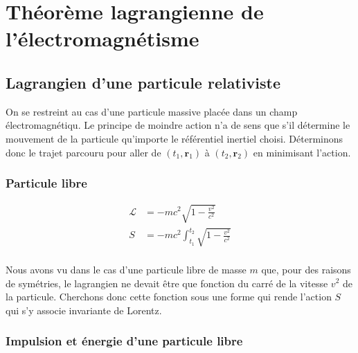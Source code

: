 \section{Théorème lagrangienne de l’électromagnétisme}

    \subsection{Lagrangien d’une particule relativiste}

    On se restreint au cas d’une particule massive placée dans un champ électromagnétiqu. Le principe de moindre action n’a de sens que s’il détermine le mouvement de la particule qu’importe le référentiel inertiel choisi. Déterminons donc le trajet parcouru pour aller de $(t_1, \mathbf{r}_1)$ à $(t_2, \mathbf{r}_2)$ en minimisant l’action.

        \subsubsection{Particule libre}

        \begin{omed}{}
            \begin{align*}
            \mathcal{L} &= - m c^2 \sqrt{1 - \frac{v^2}{c^2}} \\
            S &= - mc^2 \int_{t_1}^{t_2} \sqrt{1 - \frac{v^2}{c^2}} \\
        \end{align*}
        \end{omed}

        Nous avons vu dans le cas d’une particule libre de masse $m$ que, pour des raisons de symétries, le lagrangien ne devait être que fonction du carré de la vitesse $v^2$ de la particule. Cherchons donc cette fonction sous une forme qui rende l’action $S$ qui s’y associe invariante de Lorentz.

        

        \subsubsection{Impulsion et énergie d’une particule libre}

